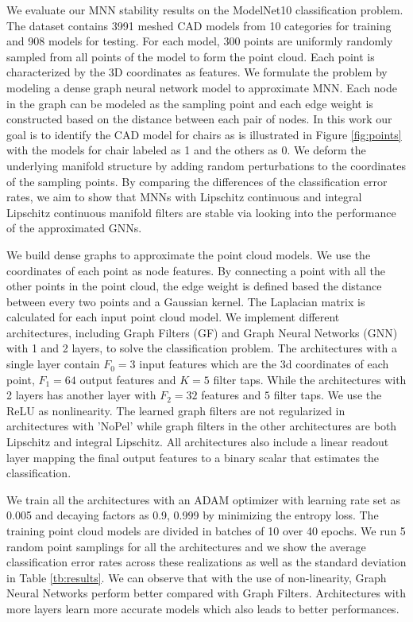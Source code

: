  We evaluate our MNN stability results on the ModelNet10 \cite{wu20153d} classification problem. The dataset contains 3991 meshed CAD models from 10 categories for training and 908 models for testing. For each model, 300 points are uniformly randomly sampled from all points of the model to form the point cloud. Each point is characterized by the 3D coordinates as features. We formulate the problem by modeling a dense graph neural network model to approximate MNN. Each node in the graph can be modeled as the sampling point and each edge weight is constructed based on the distance between each pair of nodes.  In this work our goal is to identify the CAD model for chairs as is illustrated in Figure \ref{fig:points} with the models for chair labeled as 1 and the others as 0. We deform the underlying manifold structure by adding random perturbations to the coordinates of the sampling points. By comparing the differences of the classification error rates, we aim to show that MNNs with Lipschitz continuous and integral Lipschitz continuous manifold filters are stable via looking into the performance of the approximated GNNs. 

 We build dense graphs to approximate the point cloud models. We use the coordinates of each point as node features. By connecting a point with all the other points in the point cloud, the edge weight is defined based the distance between every two points and a Gaussian kernel. The Laplacian matrix is calculated for each input point cloud model. We implement different architectures, including Graph Filters (GF) and Graph Neural Networks (GNN) with 1 and 2 layers,  to solve the classification problem. The architectures with a single layer contain $F_0=3$ input features which are the 3d coordinates of each point, $F_1=64$ output features and $K=5$ filter taps. While the architectures with 2 layers has another layer with $F_2= 32$ features and $5$ filter taps. We use the ReLU as nonlinearity. The learned graph filters are not regularized in architectures with 'NoPel' while graph filters in the other architectures are both Lipschitz and integral Lipschitz. All architectures also include a linear readout layer mapping the final output features to a binary scalar that estimates the classification. 

 We train all the architectures with an ADAM optimizer \cite{kingma2014adam} with learning rate set as 0.005 and decaying factors as 0.9, 0.999 by minimizing the entropy loss. The training point cloud models are divided in batches of 10 over 40 epochs. We run 5 random point samplings for all the architectures and we show the average classification error rates across these realizations as well as the standard deviation in Table \ref{tb:results}. We can observe that with the use of non-linearity, Graph Neural Networks perform better compared with Graph Filters. Architectures with more layers learn more accurate models which also leads to better performances.  

